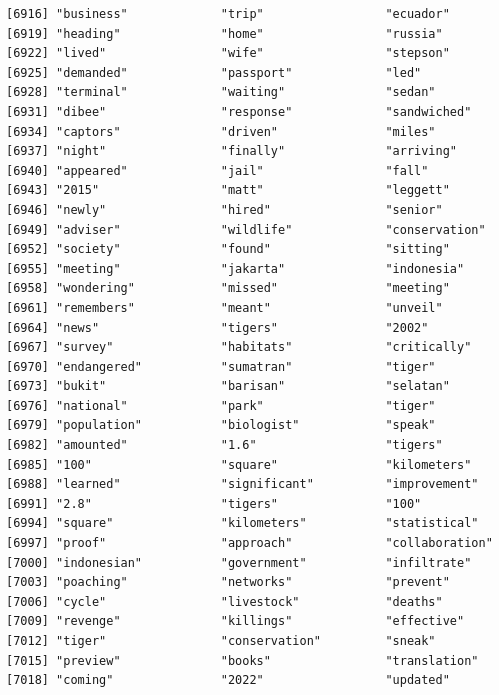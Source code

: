 \documentclass[
  letterpaper,
  DIV=11,
  numbers=noendperiod]{scrartcl}
\begin{document}
\begin{verbatim}
[6916] "business"             "trip"                 "ecuador"             
[6919] "heading"              "home"                 "russia"              
[6922] "lived"                "wife"                 "stepson"             
[6925] "demanded"             "passport"             "led"                 
[6928] "terminal"             "waiting"              "sedan"               
[6931] "dibee"                "response"             "sandwiched"          
[6934] "captors"              "driven"               "miles"               
[6937] "night"                "finally"              "arriving"            
[6940] "appeared"             "jail"                 "fall"                
[6943] "2015"                 "matt"                 "leggett"             
[6946] "newly"                "hired"                "senior"              
[6949] "adviser"              "wildlife"             "conservation"        
[6952] "society"              "found"                "sitting"             
[6955] "meeting"              "jakarta"              "indonesia"           
[6958] "wondering"            "missed"               "meeting"             
[6961] "remembers"            "meant"                "unveil"              
[6964] "news"                 "tigers"               "2002"                
[6967] "survey"               "habitats"             "critically"          
[6970] "endangered"           "sumatran"             "tiger"               
[6973] "bukit"                "barisan"              "selatan"             
[6976] "national"             "park"                 "tiger"               
[6979] "population"           "biologist"            "speak"               
[6982] "amounted"             "1.6"                  "tigers"              
[6985] "100"                  "square"               "kilometers"          
[6988] "learned"              "significant"          "improvement"         
[6991] "2.8"                  "tigers"               "100"                 
[6994] "square"               "kilometers"           "statistical"         
[6997] "proof"                "approach"             "collaboration"       
[7000] "indonesian"           "government"           "infiltrate"          
[7003] "poaching"             "networks"             "prevent"             
[7006] "cycle"                "livestock"            "deaths"              
[7009] "revenge"              "killings"             "effective"           
[7012] "tiger"                "conservation"         "sneak"               
[7015] "preview"              "books"                "translation"         
[7018] "coming"               "2022"                 "updated"             

\end{verbatim}
\end{document}
